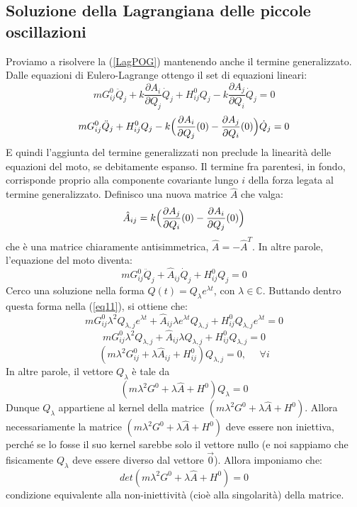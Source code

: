 \documentclass[a4paper,openany]{article}
\begin{document}
	\subsection{Soluzione della Lagrangiana delle piccole oscillazioni}
	Proviamo a risolvere la (\ref{LagPOG}) mantenendo anche il termine generalizzato. Dalle equazioni di Eulero-Lagrange ottengo il set di equazioni lineari:
	\begin{equation}
		mG_{ij}^{0}\ddot{Q}_j + k\dfrac{\partial A_i}{\partial Q_j}\dot{Q}_j+ H_{ij}^{0}Q_{j} - k\dfrac{\partial A_j}{\partial Q_i}\dot{Q}_j = 0
	\end{equation} 
	\begin{equation}
		mG_{ij}^{0}\ddot{Q}_j + H_{ij}^{0}Q_{j} - k\Bigl(\dfrac{\partial A_i}{\partial Q_j}(0)-\dfrac{\partial A_j}{\partial Q_i}(0)\Bigl)\dot{Q}_j = 0
	\end{equation} 
	E quindi l'aggiunta del termine generalizzati non preclude la linearità delle equazioni del moto, se debitamente espanso. Il termine fra parentesi, in fondo, corrisponde proprio alla componente covariante lungo $i$ della forza legata al termine generalizzato. Definisco una nuova matrice $\hat{A}$ che valga:
	\begin{equation}\label{key}
		\hat{A}_{ij} = k\Bigl(\dfrac{\partial A_j}{\partial Q_i}(0)-\dfrac{\partial A_i}{\partial Q_j}(0)\Bigl)
	\end{equation}
	che è una matrice chiaramente antisimmetrica, $\hat{A}=-\hat{A}^{T}$. In altre parole, l'equazione del moto diventa:
	\begin{equation}
		mG_{ij}^{0}\ddot{Q}_j + \hat{A}_{ij}\dot{Q}_j + H_{ij}^{0}Q_{j} = 0
		\label{eq11}
	\end{equation} 
	Cerco una soluzione nella forma $Q(t) = Q_{\lambda}e^{\lambda t}$, con $\lambda\in\mathbb{C}$. Buttando dentro questa forma nella (\ref{eq11}), si ottiene che:
	$$
	mG_{ij}^{0}\lambda^{2}Q_{\lambda,j}e^{\lambda t} + \hat{A}_{ij} \lambda e^{\lambda t}Q_{\lambda,j}+ H_{ij}^{0}Q_{\lambda,j} e^{\lambda t} = 0
	$$
	$$
	mG_{ij}^{0}\lambda^{2}Q_{\lambda,j} + \hat{A}_{ij} \lambda Q_{\lambda,j}+ H_{ij}^{0}Q_{\lambda,j} = 0
	$$
	\begin{equation}
		(m\lambda^{2}G_{ij}^{0}+\lambda \hat{A}_{ij} + H_{ij}^{0})Q_{\lambda,j} = 0,   \>\>\>\>\>\> \forall i
		\label{Eq10}
	\end{equation}
	In altre parole, il vettore $Q_{\lambda}$ è tale da
	\begin{equation}
		(m\lambda^{2}G^{0}+\lambda \hat{A} + H^{0})Q_{\lambda} = 0
		\label{eq12}
	\end{equation}
	Dunque $Q_{\lambda}$ appartiene al kernel della matrice $(m\lambda^{2}G^{0}+\lambda\hat{A}+H^{0})$. Allora necessariamente la matrice $(m\lambda^{2}G^{0}+\lambda\hat{A} + H^{0})$ deve essere non iniettiva, perché se lo fosse il suo kernel sarebbe solo il vettore nullo (e noi sappiamo che fisicamente $Q_{\lambda}$ deve essere diverso dal vettore $\vec{0}$). Allora imponiamo che:
	\begin{equation}
		det(m\lambda^{2}G^{0}+\lambda\hat{A} + H^{0}) = 0
		\label{DetPO}
	\end{equation}
	condizione equivalente alla non-iniettività (cioè alla singolarità) della matrice.
	
\end{document}
